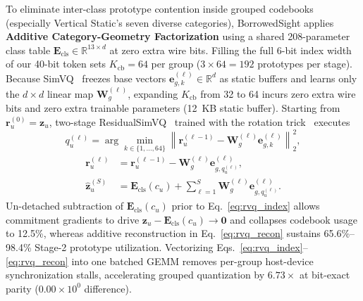 \documentclass[journal]{IEEEtran}
\begin{document}
To eliminate inter-class prototype contention inside grouped codebooks (especially Vertical Static's seven diverse categories), BorrowedSight applies \textbf{Additive Category-Geometry Factorization} using a shared 208-parameter class table $\mathbf{E}_{\mathrm{cls}} \in \mathbb{R}^{13 \times d}$ at zero extra wire bits. Filling the full 6-bit index width of our 40-bit token sets $K_{\mathrm{cb}} = 64$ per group ($3\times 64 = 192$ prototypes per stage). Because SimVQ~\cite{zhu2025simvq} freezes base vectors $\mathbf{e}_{g,k}^{(\ell)} \in \mathbb{R}^d$ as static buffers and learns only the $d\times d$ linear map $\mathbf{W}_g^{(\ell)}$, expanding $K_{\mathrm{cb}}$ from 32 to 64 incurs zero extra wire bits and zero extra trainable parameters (12~KB static buffer). Starting from $\mathbf{r}_u^{(0)} = \mathbf{z}_u$, two-stage ResidualSimVQ~\cite{zeghidour2021soundstream,zhu2025simvq} trained with the rotation trick~\cite{fifty2025rotation} executes
\begin{equation}
q_u^{(\ell)} = \arg\min_{k \in \{1,\dots,64\}} \left\|\mathbf{r}_u^{(\ell-1)} - \mathbf{W}_g^{(\ell)} \mathbf{e}_{g,k}^{(\ell)}\right\|_2^2,
\label{eq:rvq_index}
\end{equation}
\begin{equation}
\begin{aligned}
\mathbf{r}_u^{(\ell)} &= \mathbf{r}_u^{(\ell-1)} - \mathbf{W}_g^{(\ell)} \mathbf{e}_{g,q_u^{(\ell)}}^{(\ell)}, \\
\hat{\mathbf{z}}_u^{(S)} &= \mathbf{E}_{\mathrm{cls}}(c_u) + \sum_{\ell=1}^{S} \mathbf{W}_g^{(\ell)} \mathbf{e}_{g,q_u^{(\ell)}}^{(\ell)}.
\end{aligned}
\label{eq:rvq_recon}
\end{equation}
Un-detached subtraction of $\mathbf{E}_{\mathrm{cls}}(c_u)$ prior to Eq.~\eqref{eq:rvq_index} allows commitment gradients to drive $\mathbf{z}_u - \mathbf{E}_{\mathrm{cls}}(c_u) \to \mathbf{0}$ and collapses codebook usage to 12.5\%, whereas additive reconstruction in Eq.~\eqref{eq:rvq_recon} sustains 65.6\%--98.4\% Stage-2 prototype utilization. Vectorizing Eqs.~\eqref{eq:rvq_index}--\eqref{eq:rvq_recon} into one batched GEMM removes per-group host-device synchronization stalls, accelerating grouped quantization by $6.73\times$ at bit-exact parity ($0.00\times 10^0$ difference).
\end{document}
